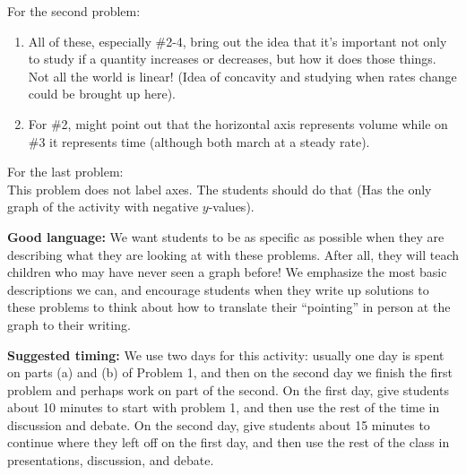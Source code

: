 \documentclass[nooutcomes,noauthor,handout]{ximera}
\begin{document}
\begin{instructorNotes}
For the second problem:
\begin{enumerate}
    \item All of these, especially \#2-4, bring out the idea that it's important not only to study if a quantity increases or decreases, but how it does those things.  Not all the world is linear! (Idea of concavity and studying when rates change could be brought up here).
    \item For \#2, might point out that the horizontal axis represents volume while on \#3 it represents time (although both march at a steady rate).
\end{enumerate}

For the last problem:\\
This problem does not label axes.  The students should do that (Has the only graph of the activity with negative $y$-values).





{\bf Good language:} We want students to be as specific as possible when they are describing what they are looking at with these problems. After all, they will teach children who may have never seen a graph before! We emphasize the most basic descriptions we can, and encourage students when they write up solutions to these problems to think about how to translate their ``pointing'' in person at the graph to their writing.



{\bf Suggested timing:} We use two days for this activity: usually one day is spent on parts (a) and (b) of Problem 1, and then on the second day we finish the first problem and perhaps work on part of the second. On the first day, give students about 10 minutes to start with problem 1, and then use the rest of the time in discussion and debate. On the second day, give students about 15 minutes to continue where they left off on the first day, and then use the rest of the class in presentations, discussion, and debate.


\end{instructorNotes}
\end{document}
